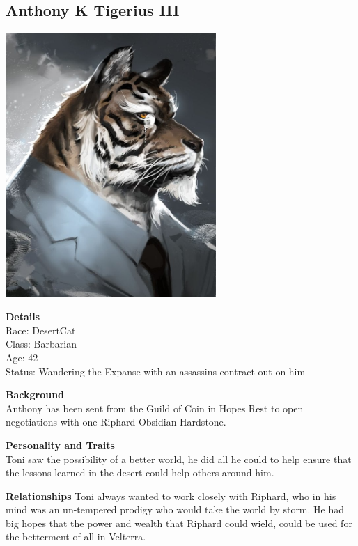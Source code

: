 \subsection{Anthony K Tigerius III}
\begin{center}
\includegraphics[width=80mm]{./content/img/toniTiger.jpg}
\begin{figure}[h]
\end{figure}
\end{center}

\textbf{Details}\\
Race: DesertCat\\
Class: Barbarian\\
Age: 42\\
Status: Wandering the Expanse with an assassins contract out on him\bigskip

\textbf{Background}\\
Anthony has been sent from the Guild of Coin in Hopes Rest to open negotiations with one Riphard Obsidian Hardstone.

\textbf{Personality and Traits}\\
Toni saw the possibility of a better world, he did all he could to help ensure that the lessons learned in the desert could help others around him.

\textbf{Relationships}
Toni always wanted to work closely with Riphard, who in his mind was an un-tempered prodigy who would take the world by storm. He had big hopes that the power and wealth that Riphard could wield, could be used for the betterment of all in Velterra.\bigskip

\clearpage
